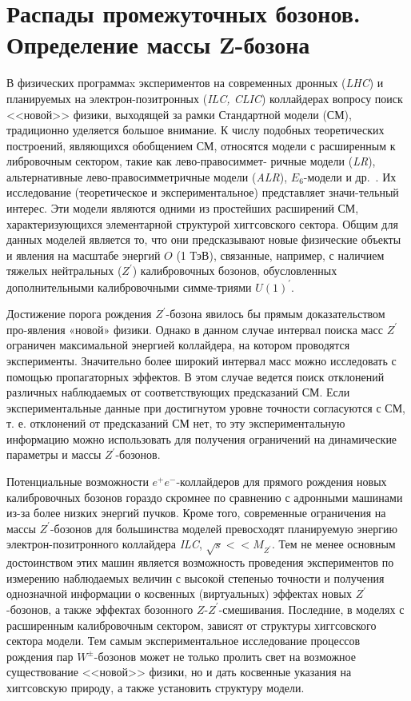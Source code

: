 \section{Распады промежуточных бозонов. Определение массы Z-бозона}

В физических программаx экспериментов на  современных  дронных (\textit{LHC}) и планируемых на  электрон-позитронных (\textit{ILC, CLIC}) коллайдерах вопросу поиск  <<новой>> физики, выходящей за  рамки Стандартной модели (СМ), традиционно уделяется большое внимание. К числу подобных теоретических построений, являющихся обобщением СМ, относятся модели с расширенным к либровочным сектором, такие как лево-правосиммет- 
ричные модели (\textit{LR}), альтернативные лево-правосимметричные модели (\textit{ALR}), $E_6$-модели
и др.~\cite{Bobovnikov:2016}. Их исследование (теоретическое и экспериментальное) представляет значи-тельный интерес. Эти модели являются одними из простейших расширений СМ, характеризующихся элементарной структурой хиггсовского сектора. Общим для данных моделей является то, что они предсказывают новые физические объекты и явления на масштабе энергий $O$ (1 ТэВ), связанные, например, с наличием тяжелых нейтральных ($Z^\prime$) калибровочных бозонов, обусловленных дополнительными калибровочными симме-триями $U(1)^\prime$.

Достижение порога рождения $Z^\prime$-бозона явилось бы прямым доказательством про-явления «новой» физики. Однако в данном случае интервал поиска масс $Z^\prime$ ограничен максимальной энергией коллайдера, на котором проводятся эксперименты. Значительно более широкий интервал масс можно исследовать с помощью пропагаторных эффектов. В этом случае ведется поиск отклонений различных наблюдаемых от соответствующих предсказаний СМ. Если экспериментальные данные при достигнутом уровне точности согласуются с СМ, т. е. отклонений от предсказаний СМ нет, то эту экспериментальную информацию можно использовать для получения ограничений на динамические параметры и массы $Z^\prime$-бозонов.

Потенциальные возможности $e^+$$e^-$-коллайдеров для прямого рождения новых калибровочных бозонов гораздо скромнее по сравнению с адронными машинами из-за более низких энергий пучков. Кроме того, современные ограничения на массы $Z^\prime$-бозонов для большинства моделей превосходят планируемую энергию электрон-позитронного коллайдера \textit{ILC}, $\sqrt{s}<< M_{Z^\prime}$. Тем не менее основным достоинством этих машин является возможность проведения экспериментов по измерению наблюдаемых величин с высокой степенью точности и получения однозначной информации о косвенных (виртуальных) эффектах новых $Z^\prime$-бозонов, а также эффектах бозонного $Z$-$Z^\prime$-смешивания. Последние, в моделях с расширенным калибровочным сектором, зависят от структуры хиггсовского сектора модели. Тем самым экспериментальное исследование процессов рождения пар $W^±$-бозонов может не только пролить свет на возможное существование <<новой>> физики, но и дать косвенные указания на хиггсовскую природу, а также установить структуру модели.

